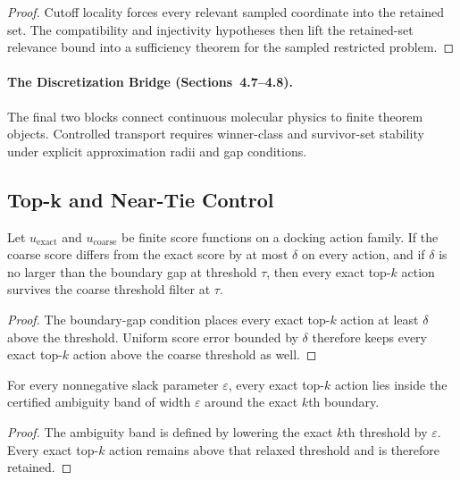 \begin{proof}
Cutoff locality forces every relevant sampled coordinate into the retained set. The compatibility and injectivity hypotheses then lift the retained-set relevance bound into a sufficiency theorem for the sampled restricted problem.
\end{proof}

\paragraph{The Discretization Bridge (Sections~4.7--4.8).}
The final two blocks connect continuous molecular physics to finite theorem objects. Controlled transport requires winner-class and survivor-set stability under explicit approximation radii and gap conditions.

\subsection{Top-k and Near-Tie Control}

\begin{theorem}\label{thm:topk-boundary-gap}
Let $u_{\mathrm{exact}}$ and $u_{\mathrm{coarse}}$ be finite score functions on a docking action family. If the coarse score differs from the exact score by at most $\delta$ on every action, and if $\delta$ is no larger than the boundary gap at threshold $\tau$, then every exact top-$k$ action survives the coarse threshold filter at $\tau$.
\end{theorem}

\begin{proof}
The boundary-gap condition places every exact top-$k$ action at least $\delta$ above the threshold. Uniform score error bounded by $\delta$ therefore keeps every exact top-$k$ action above the coarse threshold as well.
\end{proof}

\begin{theorem}\label{thm:topk-ambiguity-band}
For every nonnegative slack parameter $\varepsilon$, every exact top-$k$ action lies inside the certified ambiguity band of width $\varepsilon$ around the exact $k$th boundary.
\end{theorem}

\begin{proof}
The ambiguity band is defined by lowering the exact $k$th threshold by $\varepsilon$. Every exact top-$k$ action remains above that relaxed threshold and is therefore retained.
\end{proof}

